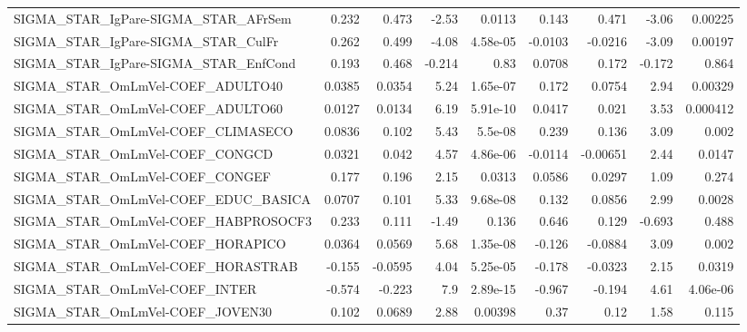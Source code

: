 \begin{tabular}{lrrrrrrrr}
SIGMA\_STAR\_IgPare-SIGMA\_STAR\_AFrSem   &       0.232 &        0.473 &    -2.53 &   0.0113 &      0.143 &       0.471 &        -3.06 &       0.00225 \\
SIGMA\_STAR\_IgPare-SIGMA\_STAR\_CulFr    &       0.262 &        0.499 &    -4.08 & 4.58e-05 &    -0.0103 &     -0.0216 &        -3.09 &       0.00197 \\
SIGMA\_STAR\_IgPare-SIGMA\_STAR\_EnfCond  &       0.193 &        0.468 &   -0.214 &     0.83 &     0.0708 &       0.172 &       -0.172 &         0.864 \\
SIGMA\_STAR\_OmLmVel-COEF\_ADULTO40      &      0.0385 &       0.0354 &     5.24 & 1.65e-07 &      0.172 &      0.0754 &         2.94 &       0.00329 \\
SIGMA\_STAR\_OmLmVel-COEF\_ADULTO60      &      0.0127 &       0.0134 &     6.19 & 5.91e-10 &     0.0417 &       0.021 &         3.53 &      0.000412 \\
SIGMA\_STAR\_OmLmVel-COEF\_CLIMASECO     &      0.0836 &        0.102 &     5.43 &  5.5e-08 &      0.239 &       0.136 &         3.09 &         0.002 \\
SIGMA\_STAR\_OmLmVel-COEF\_CONGCD        &      0.0321 &        0.042 &     4.57 & 4.86e-06 &    -0.0114 &    -0.00651 &         2.44 &        0.0147 \\
SIGMA\_STAR\_OmLmVel-COEF\_CONGEF        &       0.177 &        0.196 &     2.15 &   0.0313 &     0.0586 &      0.0297 &         1.09 &         0.274 \\
SIGMA\_STAR\_OmLmVel-COEF\_EDUC\_BASICA   &      0.0707 &        0.101 &     5.33 & 9.68e-08 &      0.132 &      0.0856 &         2.99 &        0.0028 \\
SIGMA\_STAR\_OmLmVel-COEF\_HABPROSOCF3   &       0.233 &        0.111 &    -1.49 &    0.136 &      0.646 &       0.129 &       -0.693 &         0.488 \\
SIGMA\_STAR\_OmLmVel-COEF\_HORAPICO      &      0.0364 &       0.0569 &     5.68 & 1.35e-08 &     -0.126 &     -0.0884 &         3.09 &         0.002 \\
SIGMA\_STAR\_OmLmVel-COEF\_HORASTRAB     &      -0.155 &      -0.0595 &     4.04 & 5.25e-05 &     -0.178 &     -0.0323 &         2.15 &        0.0319 \\
SIGMA\_STAR\_OmLmVel-COEF\_INTER         &      -0.574 &       -0.223 &      7.9 & 2.89e-15 &     -0.967 &      -0.194 &         4.61 &      4.06e-06 \\
SIGMA\_STAR\_OmLmVel-COEF\_JOVEN30       &       0.102 &       0.0689 &     2.88 &  0.00398 &       0.37 &        0.12 &         1.58 &         0.115 \\

\end{tabular}
